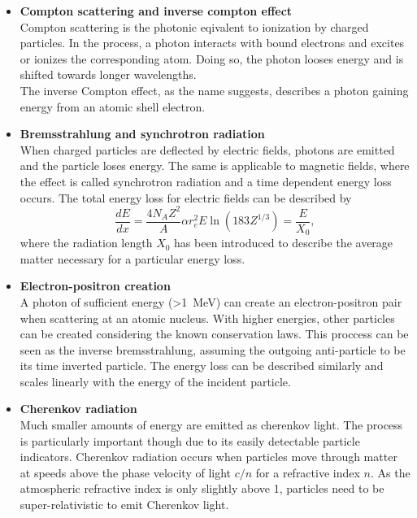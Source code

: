 \begin{itemize}
\begin{itemize}
		\item{\bf Compton scattering and inverse compton effect}\\
		Compton scattering is the photonic eqivalent to ionization by charged particles. In the process, a photon interacts with bound electrons and excites or ionizes the corresponding atom. Doing so, the photon looses energy and is shifted towards longer wavelengths.\\
		The inverse Compton effect, as the name suggests, describes a photon gaining energy from an atomic shell electron.
		
		\item{\bf Bremsstrahlung and synchrotron radiation}\\
		When charged particles are deflected by electric fields, photons are emitted and the particle loses energy. The same is applicable to magnetic fields, where the effect is called synchrotron radiation and a time dependent energy loss occurs. The total energy loss for electric fields can be described by
		\begin{equation}
			\frac{dE}{dx} = \frac{4N_AZ^2}{A}\alpha r_e^2 E  \ln{\left(183 Z^{1/3}\right)} = \frac{E}{X_0},
		\end{equation}
		where the radiation length $X_0$ has been introduced to describe the average matter necessary for a particular energy loss.
		
		\item{\bf Electron-positron creation}\\
		A photon of sufficient energy (>\SI{1}{\mega\electronvolt}) can create an electron-positron pair  when scattering at an atomic nucleus. With higher energies, other particles can be created considering the known conservation laws. 
		This proccess can be seen as the inverse bremsstrahlung, assuming the outgoing anti-particle to be its time inverted particle. The energy loss can be described similarly and scales linearly with the energy of the incident particle.

		\item{\bf Cherenkov radiation}\\
		Much smaller amounts of energy are emitted as cherenkov light. The process is particularly important though due to its easily detectable particle indicators. Cherenkov radiation occurs when particles move through matter at speeds above the phase velocity of light $c/n$ for a refractive index $n$. As the atmospheric refractive index is only slightly above 1, particles need to be super-relativistic to emit Cherenkov light. 		
    \end{itemize}
    \end{itemize}
